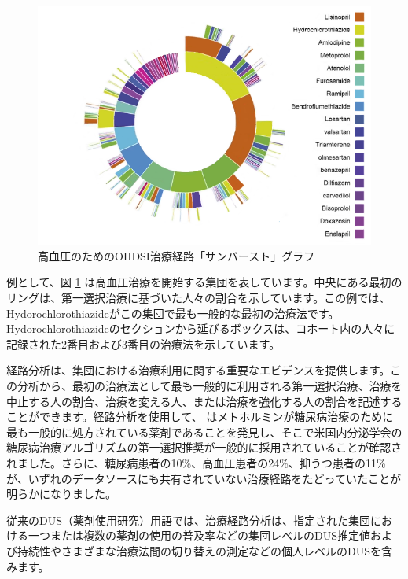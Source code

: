 \documentclass[
  11pt]{book}
\theoremstyle{definition}
\theoremstyle{definition}
\theoremstyle{definition}
\theoremstyle{definition}
\theoremstyle{remark}
\begin{document}
\begin{figure}

{\centering \includegraphics[width=1\linewidth]{images/Characterization/pnasTreatmentPathwaysSunburst} 

}

\caption{高血圧のためのOHDSI治療経路「サンバースト」グラフ}\label{fig:treatmentPathwaysSunburstDataViz}
\end{figure}

例として、図 \ref{fig:treatmentPathwaysSunburstDataViz} は高血圧治療を開始する集団を表しています。中央にある最初のリングは、第一選択治療に基づいた人々の割合を示しています。この例では、Hydorochlorothiazideがこの集団で最も一般的な最初の治療法です。Hydorochlorothiazideのセクションから延びるボックスは、コホート内の人々に記録された2番目および3番目の治療法を示しています。

経路分析は、集団における治療利用に関する重要なエビデンスを提供します。この分析から、最初の治療法として最も一般的に利用される第一選択治療、治療を中止する人の割合、治療を変える人、または治療を強化する人の割合を記述することができます。経路分析を使用して、\citet{Hripcsak7329} はメトホルミンが糖尿病治療のために最も一般的に処方されている薬剤であることを発見し、そこで米国内分泌学会の糖尿病治療アルゴリズムの第一選択推奨が一般的に採用されていることが確認されました。さらに、糖尿病患者の10\%、高血圧患者の24\%、抑うつ患者の11\%が、いずれのデータソースにも共有されていない治療経路をたどっていたことが明らかになりました。

従来のDUS（薬剤使用研究）用語では、治療経路分析は、指定された集団における一つまたは複数の薬剤の使用の普及率などの集団レベルのDUS推定値および持続性やさまざまな治療法間の切り替えの測定などの個人レベルのDUSを含みます。
\end{document}
